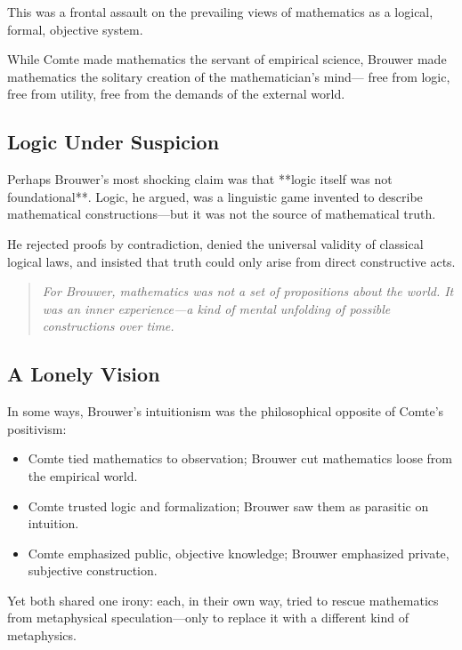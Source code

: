 This was a frontal assault on the prevailing views of mathematics as a logical, formal, objective system.

\begin{tcolorbox}[colback=gray!5, colframe=black!75!white, title={Brouwer’s Rebellion}]
While Comte made mathematics the servant of empirical science,  
Brouwer made mathematics the solitary creation of the mathematician’s mind—  
free from logic, free from utility, free from the demands of the external world.
\end{tcolorbox}

\subsection*{Logic Under Suspicion}

Perhaps Brouwer’s most shocking claim was that **logic itself was not foundational**. Logic, he argued, was a linguistic game invented to describe mathematical constructions—but it was not the source of mathematical truth.

He rejected proofs by contradiction, denied the universal validity of classical logical laws, and insisted that truth could only arise from direct constructive acts.

\begin{quote}
\textit{For Brouwer, mathematics was not a set of propositions about the world.  
It was an inner experience—a kind of mental unfolding of possible constructions over time.}
\end{quote}

\subsection*{A Lonely Vision}

In some ways, Brouwer’s intuitionism was the philosophical opposite of Comte’s positivism:

\begin{itemize}
    \item Comte tied mathematics to observation; Brouwer cut mathematics loose from the empirical world.
    \item Comte trusted logic and formalization; Brouwer saw them as parasitic on intuition.
    \item Comte emphasized public, objective knowledge; Brouwer emphasized private, subjective construction.
\end{itemize}

Yet both shared one irony: each, in their own way, tried to rescue mathematics from metaphysical speculation—only to replace it with a different kind of metaphysics.

